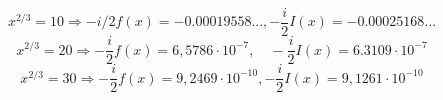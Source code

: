 

	$$x^{2/3}=10\Rightarrow -i/2f(x)=-0.00019558... ,-\frac{i}{2}I(x)=-0.00025168\ldots$$
	$$x^{2/3}=20\Rightarrow -\frac{i}{2}f(x)=6,5786\cdot10^{-7},\quad -\frac{i}{2}I(x)=6.3109\cdot 10^{-7}$$
	$$x^{2/3}=30\Rightarrow -\frac{i}{2}f(x)=9,2469\cdot10^{-10},-\frac{i} {2}I(x)=9,1261\cdot 10^{-10}$$

